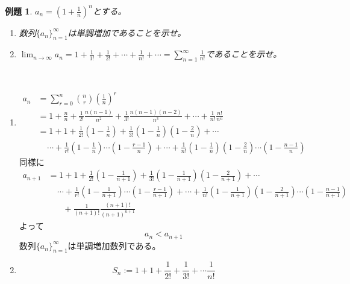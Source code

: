 \documentclass[dvipdfmx,a4j,10pt]{jsarticle}
\makeatletter
\theoremstyle{mystyle1}
\newtheorem{ex}[dfn]{例題}
\theoremstyle{mystyle2}
\newtheorem{ans}{解答}
\renewenvironment{ans}[1][解答]{\par
  \pushQED{\qed}%
  \normalfont
  \topsep6\p@\@plus6\p@ \trivlist
  \item[\hskip\labelsep{\bfseries\sffamily #1}]\ignorespaces
}{%
  \popQED\endtrivlist\@endpefalse
}
\makeatother
\begin{document}
\begin{shaded}
    \begin{ex}\label{ex2} $\displaystyle a_n=\left(1+\frac{1}{n}\right)^n$とする。
        \begin{enumerate}
            \item 数列$\{a_n\}_{n=1}^{\infty}$は単調増加であることを示せ。
            \item $\displaystyle \lim_{n\to\infty}a_n=1+\frac{1}{1!}+\frac{1}{2!}+\cdots+\frac{1}{n!}+\cdots=\sum_{n=1}^{\infty}\frac{1}{n!}$であることを示せ。
        \end{enumerate}
    \end{ex}
\end{shaded}

\begin{ans}[解\ref{ex2}]\
    \begin{enumerate}
        \item
        	\[
        	\begin{split}
        	a_n &=\sum_{r=0}^n\binom{n}{r}\left(\frac{1}{n}\right)^r\\
        	&=1+\frac{n}{n}+\frac{1}{2!}\frac{n(n-1)}{n^2}+\frac{1}{3!}\frac{n(n-1)(n-2)}{n^3}+\cdots+\frac{1}{n!}\frac{n!}{n^n}\\
        	&=1+1+\frac{1}{2!}\left(1-\frac{1}{n}\right)+\frac{1}{3!}\left(1-\frac{1}{n}\right)\left(1-\frac{2}{n}\right)+\cdots\\
        	&\ \ \ \ \ \cdots+\frac{1}{r!}\left(1-\frac{1}{n}\right)\cdots\left(1-\frac{r-1}{n}\right)+\cdots+\frac{1}{n!}\left(1-\frac{1}{n}\right)\left(1-\frac{2}{n}\right)\cdots\left(1-\frac{n-1}{n}\right)
        	\end{split}
        	\]
        	同様に
        	\[
        	\begin{split}
        	a_{n+1} &=1+1+\frac{1}{2!}\left(1-\frac{1}{n+1}\right)+\frac{1}{3!}\left(1-\frac{1}{n+1}\right)\left(1-\frac{2}{n+1}\right)+\cdots\\
        	&\ \ \ \ \ \cdots+\frac{1}{r!}\left(1-\frac{1}{n+1}\right)\cdots\left(1-\frac{r-1}{n+1}\right)+\cdots+\frac{1}{n!}\left(1-\frac{1}{n+1}\right)\left(1-\frac{2}{n+1}\right)\cdots\left(1-\frac{n-1}{n+1}\right)\\
        	&\ \ \ \ \ \ \ \ +\frac{1}{(n+1)!}\frac{(n+1)!}{(n+1)^{n+1}}
        	\end{split}
        	\]
        	よって
        	\[a_n<a_{n+1}\]
        	数列$\{a_n\}_{n=1}^{\infty}$は単調増加数列である。
        \item \[S_n:=1+1+\frac{1}{2!}+\frac{1}{3!}+\cdots\frac{1}{n!}\]

\end{enumerate}
\end{ans}
\end{document}
